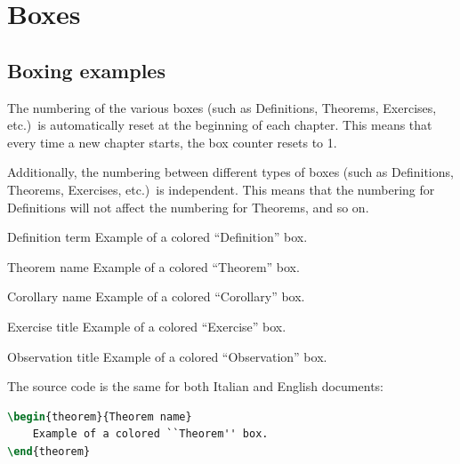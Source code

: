 \chapter{Boxes}

\section{Boxing examples}

The numbering of the various boxes (such as Definitions, Theorems, Exercises, etc.)\ is automatically reset at the beginning of each chapter. This means that every time a new chapter starts, the box counter resets to 1.

Additionally, the numbering between different types of boxes (such as Definitions, Theorems, Exercises, etc.)\ is independent. This means that the numbering for Definitions will not affect the numbering for Theorems, and so on.

\begin{definition}{Definition term}
    Example of a colored ``Definition'' box.
\end{definition}

\begin{theorem}{Theorem name}
    Example of a colored ``Theorem'' box.
\end{theorem}

\begin{corollary}{Corollary name}
    Example of a colored ``Corollary'' box.
\end{corollary}

\begin{exercise}{Exercise title}
    Example of a colored ``Exercise'' box.
\end{exercise}

\begin{observation}{Observation title}
    Example of a colored ``Observation'' box.
\end{observation}

The source code is the same for both Italian and English documents:
\begin{lstlisting}[language=TeX]
\begin{theorem}{Theorem name}
    Example of a colored ``Theorem'' box.
\end{theorem}
\end{lstlisting}
